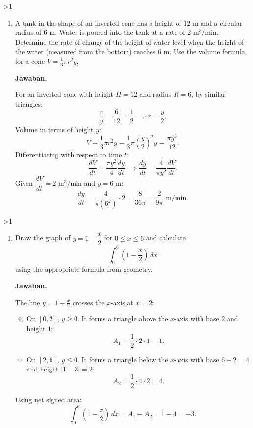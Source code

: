 \documentclass[12pt]{article}
\newcommand{\answername}{Jawaban}
\newenvironment{soaljawab}[1]{%
    \ifnum#1>1\clearpage\fi
    \begin{tcolorbox}[enhanced,breakable,height fill,height fixed for=all,
        sharp corners,colback=white,colframe=black,boxrule=0.4bp,
        boxsep=0pt,left=12bp,right=12bp,top=6bp,bottom=10bp,
        before skip=0pt,after skip=0pt,pad at break=8bp]
    \fontsize{12bp}{14bp}\selectfont
    \setlength{\abovedisplayskip}{8bp}
    \setlength{\belowdisplayskip}{8bp}
    \setlength{\abovedisplayshortskip}{8bp}
    \setlength{\belowdisplayshortskip}{8bp}
    \renewcommand{\arraystretch}{1.15}
    \begin{enumerate}[start=#1,topsep=0pt]
}{%
    \end{enumerate}
    \end{tcolorbox}
}
\newcommand{\jawaban}{\par\medskip\textbf{\answername.}\par\smallskip}
\begin{document}
\begin{soaljawab}{2}
\item A tank in the shape of an inverted cone has a height of $12\text{ m}$ and a circular radius of $6\text{ m}$. Water is poured into the tank at a rate of $2\text{ m}^3/\text{min}$. Determine the rate of change of the height of water level when the height of the water (measured from the bottom) reaches $6\text{ m}$. Use the volume formula for a cone $V = \frac{1}{3}\pi r^2 y$.
\jawaban
For an inverted cone with height $H = 12$ and radius $R = 6$, by similar triangles:
        \[
          \frac{r}{y} = \frac{6}{12} = \frac{1}{2} \implies r = \frac{y}{2}.
        \]
        Volume in terms of height $y$:
        \[
          V = \frac{1}{3}\pi r^2 y = \frac{1}{3}\pi \left(\frac{y}{2}\right)^2 y = \frac{\pi y^3}{12}.
        \]
        Differentiating with respect to time $t$:
        \[
          \frac{dV}{dt} = \frac{\pi y^2}{4} \frac{dy}{dt} \implies \frac{dy}{dt} = \frac{4}{\pi y^2} \frac{dV}{dt}.
        \]
        Given $\dfrac{dV}{dt} = 2\text{ m}^3/\text{min}$ and $y = 6\text{ m}$:
        \[
          \frac{dy}{dt} = \frac{4}{\pi (6^2)} \cdot 2 = \frac{8}{36\pi} = \frac{2}{9\pi}\text{ m/min}.
        \]
\end{soaljawab}

\begin{soaljawab}{3}
\item Draw the graph of $y = 1 - \dfrac{x}{2}$ for $0 \le x \le 6$ and calculate
        \[
          \int_{0}^{6} \left(1 - \frac{x}{2}\right) \, dx
        \]
        using the appropriate formula from geometry.
\jawaban
The line $y = 1 - \frac{x}{2}$ crosses the $x$-axis at $x = 2$:
        \begin{itemize}
          \item On $[0, 2]$, $y \ge 0$. It forms a triangle above the $x$-axis with base $2$ and height $1$:
                \[
                  A_1 = \frac{1}{2} \cdot 2 \cdot 1 = 1.
                \]
          \item On $[2, 6]$, $y \le 0$. It forms a triangle below the $x$-axis with base $6 - 2 = 4$ and height $|1 - 3| = 2$:
                \[
                  A_2 = \frac{1}{2} \cdot 4 \cdot 2 = 4.
                \]
        \end{itemize}
        Using net signed area:
        \[
          \int_{0}^{6} \left(1 - \frac{x}{2}\right) \, dx = A_1 - A_2 = 1 - 4 = -3.
        \]
\end{soaljawab}
\end{document}
